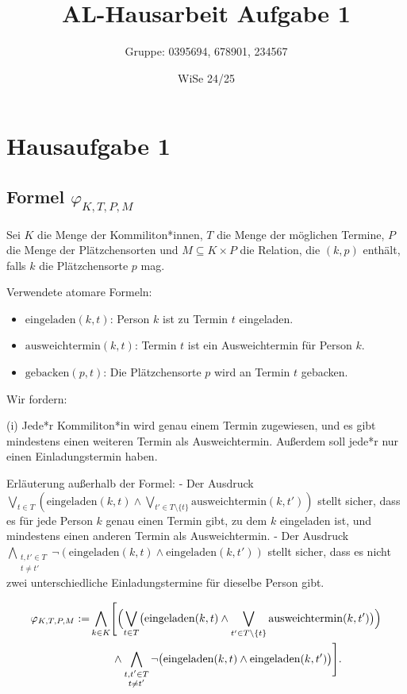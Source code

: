 \documentclass[12pt,a4paper]{article}
\title{AL-Hausarbeit Aufgabe 1}
\author{Gruppe: 0395694, 678901, 234567}
\date{WiSe 24/25}
\begin{document}
\maketitle

\section*{Hausaufgabe 1}

\subsection*{Formel $\varphi_{K,T,P,M}$}

Sei $K$ die Menge der Kommiliton*innen, $T$ die Menge der möglichen Termine, 
$P$ die Menge der Plätzchensorten und $M \subseteq K \times P$ die Relation, 
die $(k,p)$ enthält, falls $k$ die Plätzchensorte $p$ mag.

Verwendete atomare Formeln:
\begin{itemize}
    \item $\text{eingeladen}(k,t)$: Person $k$ ist zu Termin $t$ eingeladen.
    \item $\text{ausweichtermin}(k,t)$: Termin $t$ ist ein Ausweichtermin für Person $k$.
    \item $\text{gebacken}(p,t)$: Die Plätzchensorte $p$ wird an Termin $t$ gebacken.
\end{itemize}

Wir fordern:

(i) Jede*r Kommiliton*in wird genau einem Termin zugewiesen, und es gibt mindestens einen weiteren Termin als Ausweichtermin. Außerdem soll jede*r nur einen Einladungstermin haben.

Erläuterung außerhalb der Formel:  
- Der Ausdruck $\bigvee_{t \in T}(\text{eingeladen}(k,t) \wedge \bigvee_{t' \in T\setminus\{t\}}\text{ausweichtermin}(k,t'))$ stellt sicher, dass es für jede Person $k$ genau einen Termin gibt, zu dem $k$ eingeladen ist, und mindestens einen anderen Termin als Ausweichtermin.  
- Der Ausdruck $\bigwedge_{\substack{t,t' \in T \\ t \neq t'}} \neg(\text{eingeladen}(k,t)\wedge\text{eingeladen}(k,t'))$ stellt sicher, dass es nicht zwei unterschiedliche Einladungstermine für dieselbe Person gibt.

\begin{align*}
\varphi_{K,T,P,M} := 
& \bigwedge_{k \in K}\Biggl[
   \Bigl(
     \bigvee_{t \in T}\bigl(\text{eingeladen}(k,t) \wedge \bigvee_{t' \in T\setminus\{t\}} \text{ausweichtermin}(k,t')\bigr)
   \Bigr) \\
& \qquad\wedge
   \bigwedge_{\substack{t,t' \in T \\ t \neq t'}} 
     \neg\bigl(\text{eingeladen}(k,t)\wedge \text{eingeladen}(k,t')\bigr)
\Biggr].
\end{align*}
\end{document}
